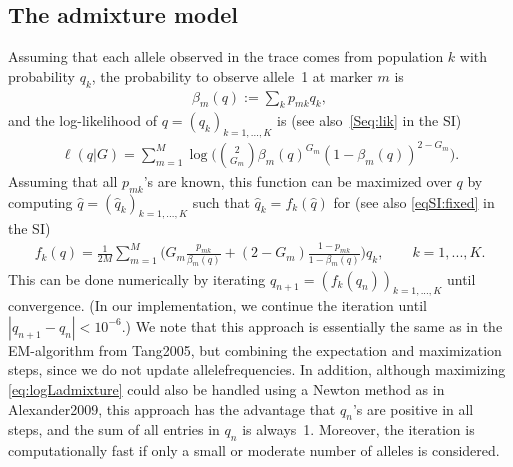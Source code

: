 \documentclass[12pt]{article}
\theoremstyle{definition}
\begin{document}
\subsection{The admixture model}
Assuming that each allele observed in the trace comes from population
$k$ with probability $q_k$, the probability to observe allele~1 at
marker $m$ is
\begin{align}
  \label{eq:beta}
  \beta_m(q) := \sum_k p_{mk} q_k,  
\end{align}
and the log-likelihood of $q = (q_k)_{k=1,...,K}$ is (see
also~\eqref{Seq:lik} in the SI)
\begin{align}\label{eq:logLadmixture}
  \ell(q|G) = \sum_{m=1}^M \log\Big(\binom{2}{G_m} \beta_m(q)^{G_m}(1-\beta_m(q))^{2-G_m}\Big).
\end{align}
Assuming that all $p_{mk}$'s are known, this function can be maximized
over $q$ by computing $\hat q = (\hat q_k)_{k=1,...,K}$ such that
$\hat q_k = f_k(\hat q)$ for (see also \eqref{eqSI:fixed} in the SI)
\begin{align}\label{eq:fixed}
  f_k(q) =
  \frac{1}{2M} \sum_{m=1}^M \Big(G_m \frac{p_{mk}}{\beta_m(q)} + (2-G_m)\frac{1-p_{mk}}{1-\beta_m(q)}\Big)q_k,
  \qquad k =1,...,K.
\end{align}
This can be done numerically by iterating
$q_{n+1} = (f_k(q_n))_{k=1,...,K}$ until convergence. (In our
implementation, we continue the iteration until
$|q_{n+1} - q_n|< 10^{-6}$.) We note that this approach is essentially
the same as in the EM-algorithm from \cite{article}{Tang2005}, but combining
the expectation and maximization steps, since we do not update
allelefrequencies. In addition, although maximizing
\eqref{eq:logLadmixture} could also be handled using a Newton method
as in \cite{article}{Alexander2009}, this approach has the advantage that
$q_n$'s are positive in all steps, and the sum of all entries in $q_n$
is always~1. Moreover, the iteration is computationally fast if only a
small or moderate number of alleles is considered.
\end{document}
